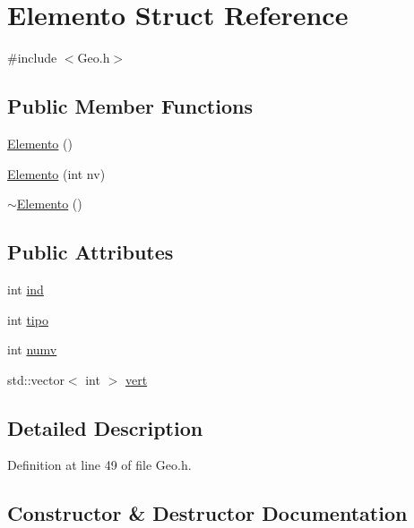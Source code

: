 \hypertarget{structElemento}{}\section{Elemento Struct Reference}
\label{structElemento}


{\ttfamily \#include $<$Geo.\+h$>$}

\subsection*{Public Member Functions}
\begin{DoxyCompactItemize}
\item 
\hyperlink{structElemento_abdb1b202fbf4a8c9bba2e6b25cc5166b}{Elemento} ()
\item 
\hyperlink{structElemento_a325d9d7ed38643b0669d584604c89f15}{Elemento} (int nv)
\item 
\hyperlink{structElemento_af49135626b9f2b5e50d93fb36620e359}{$\sim$\+Elemento} ()
\end{DoxyCompactItemize}
\subsection*{Public Attributes}
\begin{DoxyCompactItemize}
\item 
int \hyperlink{structElemento_ad35819e9864802ac413d0ff3db31f3c6}{ind}
\item 
int \hyperlink{structElemento_a46319a39b4dec556841a201eeed7266a}{tipo}
\item 
int \hyperlink{structElemento_a34b767c0ea5585cf587648b1cf1a5909}{numv}
\item 
std\+::vector$<$ int $>$ \hyperlink{structElemento_a49a35fa3d1cb067a942e2f6021c679c9}{vert}
\end{DoxyCompactItemize}


\subsection{Detailed Description}


Definition at line 49 of file Geo.\+h.



\subsection{Constructor \& Destructor Documentation}
\mbox{\label{structElemento_abdb1b202fbf4a8c9bba2e6b25cc5166b}} 
